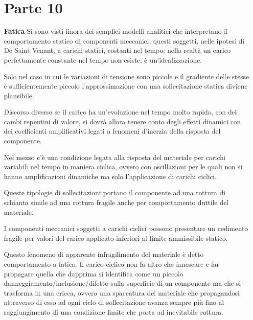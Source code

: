 \documentclass{article}
\def\outcome{\textbf{Learning Outcomes:} Outcomes go here. }
\begin{document}
	\section*{Parte 10} %

\begin{adjustwidth}{2in}{} 
	
\textbf{{\Large Fatica}} \mbox{} \newline
		Si sono visti finora dei semplici modelli analitici che interpretano il comportamento statico di componenti meccanici, questi  soggetti, nelle ipotesi di De Saint Venant, a carichi statici, costanti nel tempo; nella realtà un carico perfettamente constante nel tempo non esiste, è un'idealizzazione. 
		
		Solo nel caso in cui le variazioni di tensione sono piccole e il gradiente delle stesse è sufficientemente piccolo l'approssimazione con una sollecitazione statica diviene plausibile. \newline
		
		Discorso diverso se il carico ha un'evoluzione nel tempo molto rapida, con dei cambi repentini di valore, si dovrà allora tenere conto degli effetti dinamici con dei coefficienti amplificativi legati a fenomeni d'inerzia della risposta del componente. \newline
		
		Nel mezzo c'è una condizione legata alla risposta del materiale per carichi variabili nel tempo in maniera ciclica, ovvero con oscillazioni per le quali non si hanno amplificazioni dinamiche ma solo l'applicazione di carichi ciclici. 
		
		Queste tipologie di sollecitazioni portano il componente ad una rottura di schianto simile ad una rottura fragile anche per comportamento duttile del materiale. \newline
		
		I componenti meccanici soggetti a carichi ciclici possono presentare un cedimento fragile per valori del carico applicato inferiori al limite ammissibile statico.
		
		Questo fenomeno di apparente infragilimento del materiale è detto comportamento a fatica. Il carico ciclico non fa altro che innescare e far propagare quella che dapprima si identifica come un piccolo danneggiamento/inclusione/difetto sulla superficie di un componente ma che si trasforma in una cricca, ovvero una spaccatura del materiale che propagandosi attraverso di esso ad ogni ciclo di sollecitazione avanza sempre più fino al raggiungimento di una condizione limite che porta ad inevitabile rottura. \newline
		

\end{adjustwidth}
\end{document}

